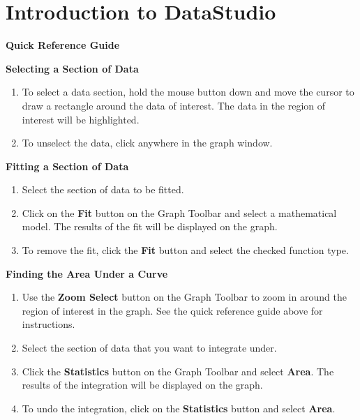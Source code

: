 
\section{Introduction to DataStudio}
\label{datastudio}

\textbf{Quick Reference Guide}


\vspace{0.3cm}
{\par\centering {} \par}
\vspace{0.3cm}

\textbf{Selecting a Section of Data}

\begin{enumerate}
\item To select a data section, hold the mouse button down and move the cursor to
draw a rectangle around the data of interest. The data in the region of interest
will be highlighted.
\item To unselect the data, click anywhere in the graph window.
\end{enumerate}
\textbf{Fitting a Section of Data}

\begin{enumerate}
\item Select the section of data to be fitted.
\item Click on the \textbf{Fit} button on the Graph Toolbar and select a mathematical
model. The results of the fit will be displayed on the graph.
\item To remove the fit, click the \textbf{Fit} button and select the checked function
type.
\end{enumerate}


\pagebreak[2]
\textbf{Finding the Area Under a Curve}

\begin{enumerate}
\item Use the \textbf{Zoom Select} button on the Graph Toolbar to zoom in around the
region of interest in the graph. See the quick reference guide above for instructions.
\item Select the section of data that you want to integrate under.
\item Click the \textbf{Statistics} button on the Graph Toolbar and select \textbf{Area}.
The results of the integration will be displayed on the graph.
\item To undo the integration, click on the \textbf{Statistics} button and select
\textbf{Area}.
\end{enumerate}

